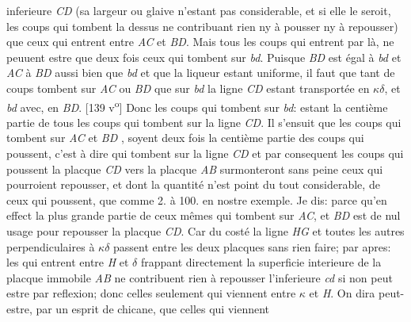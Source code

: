 inferieure \textit{CD} (sa largeur ou glaive n'estant pas considerable, et si elle le seroit, les coups qui tombent la dessus ne contribuant rien ny \`{a} pousser ny \`{a} repousser) que ceux qui entrent entre \textit{AC} et \textit{BD}. Mais tous les coups qui entrent par l\`{a}, ne peuuent estre que deux fois ceux qui tombent sur \textit{bd}. Puisque \textit{BD} est \'{e}gal \`{a} \textit{bd} et \textit{AC} \`{a} \textit{BD} aussi bien que \textit{bd} et que la liqueur estant uniforme, il faut que tant de coups tombent sur \textit{AC} ou \textit{BD} que sur \textit{bd} la ligne \textit{CD} estant transport\'{e}e  en $\kappa\delta$, et \textit{bd} avec, en \textit{BD}.
[139 v\textsuperscript{o}] Donc les coups qui tombent sur \textit{bd}:  estant la centi\`{e}me partie de tous les coups qui tombent sur la ligne  \textit{CD}. Il s'ensuit que les coups qui tombent sur \textit{AC} et \textit{BD} , soyent deux fois la centi\`{e}me partie des coups qui poussent, c'est \`{a} dire qui tombent sur la ligne \textit{CD} et par consequent les coups qui poussent la placque \textit{CD} vers la placque \textit{AB} surmonteront sans peine ceux qui pourroient repousser, et dont la quantit\'{e} n'est point du tout considerable,  de ceux qui poussent, que comme 2. \`{a} 100. en nostre exemple. Je dis:  parce qu'en effect la plus grande partie de ceux m\^{e}mes qui tombent sur \textit{AC}, et \textit{BD} est de nul usage pour repousser la placque \textit{CD}. Car du cost\'{e}  la ligne  \textit{HG} et toutes les autres perpendiculaires \`{a} $\kappa\delta$ passent entre les deux placques\protect{} sans rien faire; par apres: les  qui entrent entre \textit{H} et $\delta$ frappant directement la superficie interieure de la placque immobile \textit{AB} ne contribuent rien \`{a} repousser l'inferieure \textit{cd} si non peut estre par reflexion\protect{};  donc celles seulement qui viennent entre $\kappa$ et \textit{H}. On dira peut-estre, par un esprit de chicane, que celles qui viennent 